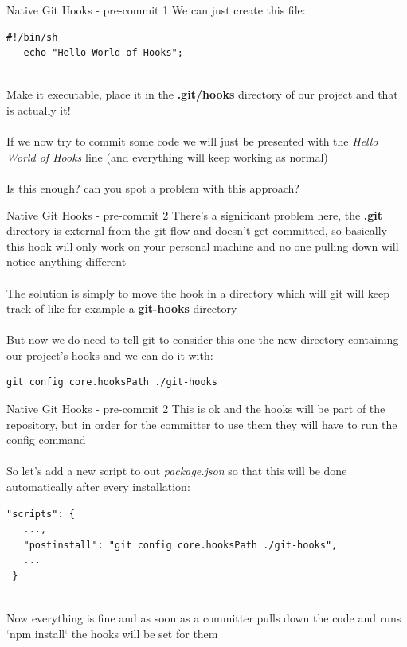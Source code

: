 \documentclass[11pt]{beamer}
\begin{document}
\begin{frame}[fragile]{Native Git Hooks - pre-commit 1}
  We can just create this file:
    \begin{lstlisting}[frame=single,columns=fullflexible]
   #!/bin/sh
   echo "Hello World of Hooks";
   \end{lstlisting}
  ~\\
  Make it executable, place it in the \textbf{.git/hooks} directory of our project and that is actually it!
  \\~\\
  If we now try to commit some code we will just be presented with the \textit{Hello World of Hooks} line (and everything will keep working as normal)
  \\~\\
  Is this enough? can you spot a problem with this approach?
\end{frame}


\begin{frame}[fragile]{Native Git Hooks - pre-commit 2}
 There's a significant problem here, the \textbf{.git} directory is external from the git flow and doesn't get committed, so basically this hook will only work on your  personal machine and no one pulling down will notice anything different
 \\~\\
 The solution is simply to move the hook in a directory which will git will keep track of like for example a \textbf{git-hooks} directory
 \\~\\
 But now we do need to tell git to consider this one the new directory containing our project's hooks and we can do it with:
 \begin{lstlisting}[columns=fullflexible]
   git config core.hooksPath ./git-hooks
 \end{lstlisting}
\end{frame}



\begin{frame}[fragile]{Native Git Hooks - pre-commit 2}
  This is ok and the hooks will be part of the repository, but in order for the committer to use them they will have to run the config command
  \\~\\
  So let's add a new script to out \textit{package.json} so that this will be done automatically after every installation:
  \begin{footnotesize}
    \begin{lstlisting}[frame=single,columns=fullflexible]
 "scripts": {
   ...,
   "postinstall": "git config core.hooksPath ./git-hooks",
   ...
 }
   \end{lstlisting}
  \end{footnotesize}
  ~\\
  Now everything is fine and as soon as a committer pulls down the code and runs `npm install` the hooks will be set for them 
\end{frame}
\end{document}
